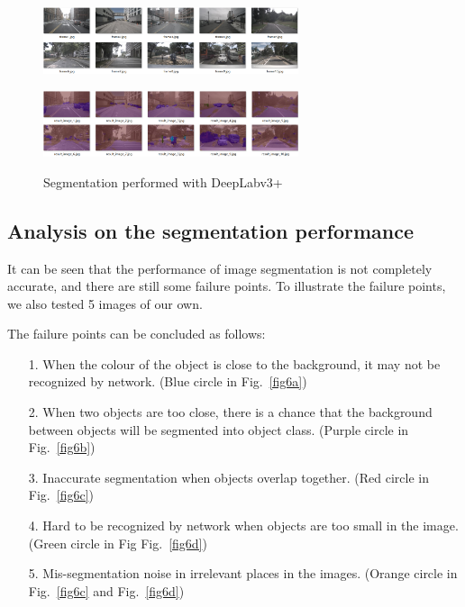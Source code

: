 \documentclass[8pt]{article}
\theoremstyle{nonumberplain}
\begin{document}
\begin{figure}[H]
	\centering
	\begin{minipage}[t]{0.48\textwidth}
		\centering
		\includegraphics[width=7.5cm]{211.png}
		\label{fig5a}
	\end{minipage}
	\begin{minipage}[t]{0.48\textwidth}
		\centering
		\includegraphics[width=7.5cm]{2.1_2.png}
		\label{fig5b}
	\end{minipage}
	\caption{Segmentation performed with DeepLabv3+}
	\label{fig5}
\end{figure} 


\subsection{Analysis on the segmentation performance}

\hspace{1.0em}
It can be seen that the performance of image segmentation is not completely accurate, and there are still some failure points. To illustrate the failure points, we also tested 5 images of our own.

The failure points can be concluded as follows:

\begin{itemize}
	\item[1.] When the colour of the object is close to the background, it may not be recognized by network. (Blue circle in Fig.~\ref{fig6a})
	\item[2.] When two objects are too close, there is a chance that the background between objects will be segmented into object class. (Purple circle in Fig.~\ref{fig6b})
	\item[3.] Inaccurate segmentation when objects overlap together. (Red circle in Fig.~\ref{fig6c})
	\item[4.] Hard to be recognized by network when objects are too small in the image. (Green circle in Fig Fig.~\ref{fig6d})
	\item[5.] Mis-segmentation noise in irrelevant places in the images. (Orange circle in Fig.~\ref{fig6c} and Fig.~\ref{fig6d})
\end{itemize}
\end{document}
